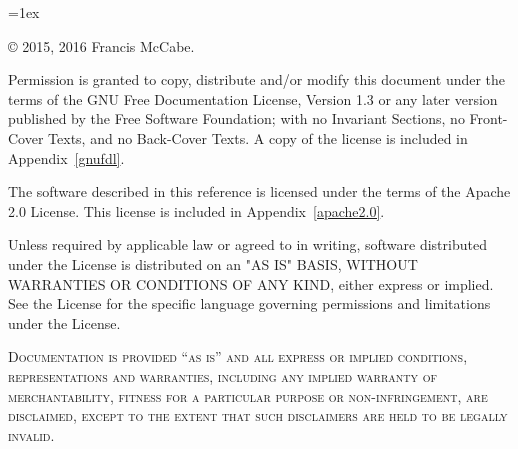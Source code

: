 \documentclass[11pt,openright,fleqn]{book}
\begin{document}
\newpage{}
{{
\parindent=0in
\parskip=1ex

\thispagestyle{fancy}
\fancyhf{} %
\newcommand{\tstamp}{\today}   
\newcommand{\Draft}{\sc draft}

\copyright{} 2015, 2016 Francis McCabe.
\vspace*{1ex}

Permission is granted to copy, distribute and/or modify this document
under the terms of the GNU Free Documentation License, Version 1.3
or any later version published by the Free Software Foundation;
with no Invariant Sections, no Front-Cover Texts, and no Back-Cover Texts.
A copy of the license is included in Appendix~\vref{gnufdl}.

The software described in this reference is licensed under the terms of the Apache 2.0 License. This license is included in Appendix~\vref{apache2.0}.

Unless required by applicable law or agreed to in writing, software
distributed under the License is distributed on an "AS IS" BASIS,
WITHOUT WARRANTIES OR CONDITIONS OF ANY KIND, either express or implied.
See the License for the specific language governing permissions and
limitations under the License.

\textsc{Documentation is provided ``as is'' and all express or implied conditions, representations and warranties, including any implied warranty of merchantability, fitness for a particular purpose or non-infringement, are disclaimed, except to the extent that such disclaimers are held to be legally invalid.}
}
\newpage{}

\pagestyle{fancy}
\renewcommand{\chaptermark}[1]{\markboth{\thechapter\ #1}{}} \renewcommand{\sectionmark}[1]{\markright{\thesection\ #1}}
\fancyhf{} %

\newcommand{\blueLine}{{\color{skyBlue}%
  \hrule width\headwidth height\headrulewidth \vskip-\headrulewidth}}


\fancyhead[LE,RO]{\bfseries}
\fancyhead[LO]{\bfseries\rightmark}
\fancyhead[RE]{\bfseries\leftmark}


\renewcommand{\headrulewidth}{0.5pt}
\renewcommand{\headrule}{{\blueLine}}

\renewcommand{\footrulewidth}{0.5pt}
\renewcommand{\footrule}{{\color{skyBlue}%
  \vskip-\footruleskip\vskip-\footrulewidth
\hrule width\headwidth height\footrulewidth\vskip\footruleskip}}
\addtolength{\headheight}{15pt} %


}
\end{document}
